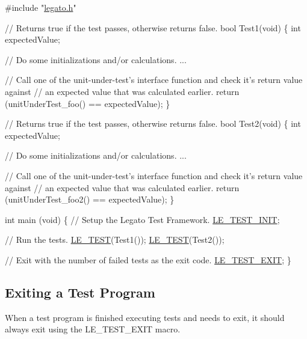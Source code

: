 \begin{DoxyCode}
\textcolor{preprocessor}{#include "\hyperlink{legato_8h}{legato.h}"}

\textcolor{comment}{// Returns true if the test passes, otherwise returns false.}
\textcolor{keywordtype}{bool} Test1(\textcolor{keywordtype}{void})
\{
    \textcolor{keywordtype}{int} expectedValue;

    \textcolor{comment}{// Do some initializations and/or calculations.}
    ...

    \textcolor{comment}{// Call one of the unit-under-test's interface function and check it's return value against}
    \textcolor{comment}{// an expected value that was calculated earlier.}
    \textcolor{keywordflow}{return} (unitUnderTest\_foo() == expectedValue);
\}


\textcolor{comment}{// Returns true if the test passes, otherwise returns false.}
\textcolor{keywordtype}{bool} Test2(\textcolor{keywordtype}{void})
\{
    \textcolor{keywordtype}{int} expectedValue;

    \textcolor{comment}{// Do some initializations and/or calculations.}
    ...

    \textcolor{comment}{// Call one of the unit-under-test's interface function and check it's return value against}
    \textcolor{comment}{// an expected value that was calculated earlier.}
    \textcolor{keywordflow}{return} (unitUnderTest\_foo2() == expectedValue);
\}


\textcolor{keywordtype}{int} main (\textcolor{keywordtype}{void})
\{
    \textcolor{comment}{// Setup the Legato Test Framework.}
    \hyperlink{le__test_8h_a219d49d27a2a5a1a6dc63f31b0b66c23}{LE\_TEST\_INIT};

    \textcolor{comment}{// Run the tests.}
    \hyperlink{le__test_8h_a555300c0c5b3442572fbcafa6dd7994b}{LE\_TEST}(Test1());
    \hyperlink{le__test_8h_a555300c0c5b3442572fbcafa6dd7994b}{LE\_TEST}(Test2());

    \textcolor{comment}{// Exit with the number of failed tests as the exit code.}
    \hyperlink{le__test_8h_a5f0517641049c368d0a55658c4f4ddec}{LE\_TEST\_EXIT};
\}
\end{DoxyCode}
\hypertarget{c_test_c_test_exit}{}\subsection{Exiting a Test Program}\label{c_test_c_test_exit}
When a test program is finished executing tests and needs to exit, it should always exit using the L\+E\+\_\+\+T\+E\+S\+T\+\_\+\+E\+X\+I\+T macro.

